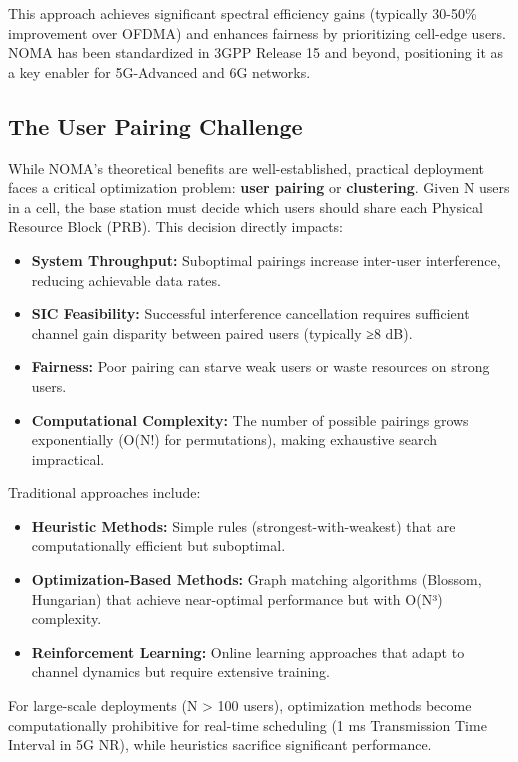 This approach achieves significant spectral efficiency gains (typically 30-50\% improvement over OFDMA) and enhances fairness by prioritizing cell-edge users. NOMA has been standardized in 3GPP Release 15 and beyond, positioning it as a key enabler for 5G-Advanced and 6G networks.

\subsection{The User Pairing Challenge}

While NOMA's theoretical benefits are well-established, practical deployment faces a critical optimization problem: \textbf{user pairing} or \textbf{clustering}. Given N users in a cell, the base station must decide which users should share each Physical Resource Block (PRB). This decision directly impacts:

\begin{itemize}
    \item \textbf{System Throughput:} Suboptimal pairings increase inter-user interference, reducing achievable data rates.
    \item \textbf{SIC Feasibility:} Successful interference cancellation requires sufficient channel gain disparity between paired users (typically ≥8 dB).
    \item \textbf{Fairness:} Poor pairing can starve weak users or waste resources on strong users.
    \item \textbf{Computational Complexity:} The number of possible pairings grows exponentially (O(N!) for permutations), making exhaustive search impractical.
\end{itemize}

Traditional approaches include:
\begin{itemize}
    \item \textbf{Heuristic Methods:} Simple rules (strongest-with-weakest) that are computationally efficient but suboptimal.
    \item \textbf{Optimization-Based Methods:} Graph matching algorithms (Blossom, Hungarian) that achieve near-optimal performance but with O(N³) complexity.
    \item \textbf{Reinforcement Learning:} Online learning approaches that adapt to channel dynamics but require extensive training.
\end{itemize}

For large-scale deployments (N > 100 users), optimization methods become computationally prohibitive for real-time scheduling (1 ms Transmission Time Interval in 5G NR), while heuristics sacrifice significant performance.

